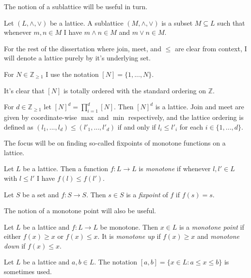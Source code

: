 The notion of a sublattice will be useful in turn.
\begin{definition}[Sublattice]
  Let $(L, \wedge, \vee)$ be a lattice. A sublattice $(M, \wedge, \vee)$ is a
  subset $M \subseteq L$ such that whenever $m, n \in M$ I have $m \wedge n \in M$ and
  $m \vee n \in M$.
\end{definition}
For the rest of the dissertation where join, meet, and $\leq$ are clear from context, I will denote a lattice purely by it's underlying set.
\begin{notation}
  For $N \in \mathbb{Z}_{\geq 1}$ I use the notation $[N] = \{1, ..., N\}$.
\end{notation}
It's clear that $[N]$ is totally ordered with the standard ordering on $\mathbb{Z}$.
\begin{cor}
  For $d \in \mathbb{Z}_{\geq 1}$ let $[N]^d = \prod_{i=1}^d [N]$. Then $[N]^d$ is a lattice. Join and meet
  are given by coordinate-wise $\max$ and $\min$ respectively, and the lattice ordering is defined as $(l_1, ..., l_d) \leq (l'_1, ..., l'_d)$
  if and only if $l_i \leq l'_i$ for each $i \in \{1, ..., d\}$.
\end{cor}
The focus will be on finding so-called fixpoints of monotone functions on a lattice.
\begin{definition}
  Let $L$ be a lattice. Then a function $f : L \to L$ is \emph{monotone} if whenever $l, l' \in L$ with
  $l \leq l'$ I have $f(l) \leq f(l')$.
\end{definition}
\begin{definition}[Fixpoint]
  Let $S$ be a set and $f : S \to S$. Then $s \in S$ is a \emph{fixpoint} of $f$ if $f(s) = s$.
\end{definition}
The notion of a monotone point will also be useful.
\begin{definition}
  Let $L$ be a lattice and $f : L \to L$ be monotone. Then $x \in L$ is a \emph{monotone point}
  if either $f(x) \geq x$ or $f(x) \leq x$. It is \emph{monotone up} if $f(x) \geq x$ and \emph{monotone
  down} if $f(x) \leq x$.
\end{definition}
\begin{notation}
  Let $L$ be a lattice and $a, b \in L$. The notation $[a, b] = \{x \in L : a \leq x \leq b\}$ is sometimes
  used.
\end{notation}
